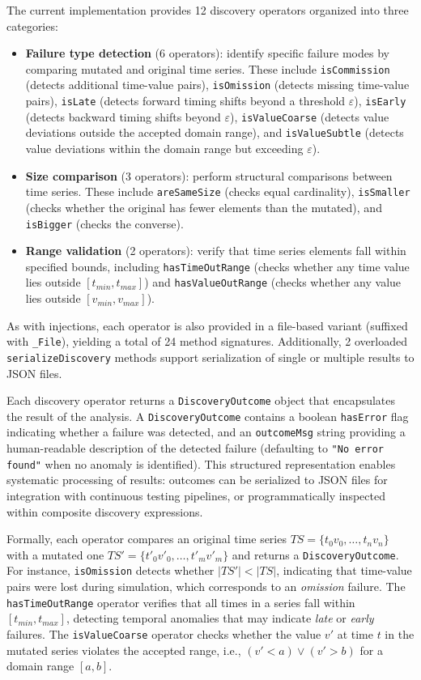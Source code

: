 The current implementation provides 12 discovery operators organized into three categories:
\begin{itemize}
    \item \textbf{Failure type detection} (6 operators): identify specific failure modes by comparing mutated and original time series. These include \texttt{isCommission} (detects additional time-value pairs), \texttt{isOmission} (detects missing time-value pairs), \texttt{isLate} (detects forward timing shifts beyond a threshold $\varepsilon$), \texttt{isEarly} (detects backward timing shifts beyond $\varepsilon$), \texttt{isValueCoarse} (detects value deviations outside the accepted domain range), and \texttt{isValueSubtle} (detects value deviations within the domain range but exceeding $\varepsilon$).
    \item \textbf{Size comparison} (3 operators): perform structural comparisons between time series. These include \texttt{areSameSize} (checks equal cardinality), \texttt{isSmaller} (checks whether the original has fewer elements than the mutated), and \texttt{isBigger} (checks the converse).
    \item \textbf{Range validation} (2 operators): verify that time series elements fall within specified bounds, including \texttt{hasTimeOutRange} (checks whether any time value lies outside $[t_{min}, t_{max}]$) and \texttt{hasValueOutRange} (checks whether any value lies outside $[v_{min}, v_{max}]$).
\end{itemize}
As with injections, each operator is also provided in a file-based variant (suffixed with \texttt{\_File}), yielding a total of 24 method signatures. Additionally, 2 overloaded \texttt{serializeDiscovery} methods support serialization of single or multiple results to JSON files.

Each discovery operator returns a \texttt{DiscoveryOutcome} object that encapsulates the result of the analysis. A \texttt{DiscoveryOutcome} contains a boolean \texttt{hasError} flag indicating whether a failure was detected, and an \texttt{outcomeMsg} string providing a human-readable description of the detected failure (defaulting to \texttt{"No error found"} when no anomaly is identified). This structured representation enables systematic processing of results: outcomes can be serialized to JSON files for integration with continuous testing pipelines, or programmatically inspected within composite discovery expressions.

Formally, each operator compares an original time series $TS = \{t_0 v_0, \ldots, t_n v_n\}$ with a mutated one $TS' = \{t'_0 v'_0, \ldots, t'_m v'_m\}$ and returns a \texttt{DiscoveryOutcome}. For instance, \texttt{isOmission} detects whether $|TS'| < |TS|$, indicating that time-value pairs were lost during simulation, which corresponds to an \textit{omission} failure. The \texttt{hasTimeOutRange} operator verifies that all times in a series fall within $[t_{min}, t_{max}]$, detecting temporal anomalies that may indicate \textit{late} or \textit{early} failures. The \texttt{isValueCoarse} operator checks whether the value $v'$ at time $t$ in the mutated series violates the accepted range, i.e., $(v' < a) \lor (v' > b)$ for a domain range $[a, b]$.

